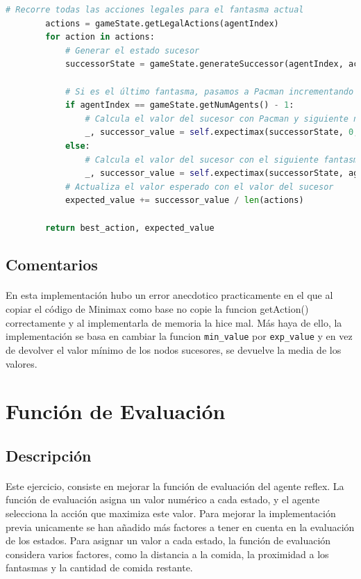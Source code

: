 \documentclass{report}
\begin{document}
\begin{lstlisting}[language=Python, caption=Implementación final del agente Expectimax]
        # Recorre todas las acciones legales para el fantasma actual
        actions = gameState.getLegalActions(agentIndex)
        for action in actions:
            # Generar el estado sucesor
            successorState = gameState.generateSuccessor(agentIndex, action)
            
            # Si es el último fantasma, pasamos a Pacman incrementando la profundidad
            if agentIndex == gameState.getNumAgents() - 1:
                # Calcula el valor del sucesor con Pacman y siguiente nivel de profundidad
                _, successor_value = self.expectimax(successorState, 0, depth + 1)
            else:
                # Calcula el valor del sucesor con el siguiente fantasma
                _, successor_value = self.expectimax(successorState, agentIndex + 1, depth)
            # Actualiza el valor esperado con el valor del sucesor
            expected_value += successor_value / len(actions)

        return best_action, expected_value            
            \end{lstlisting}
        \subsection*{Comentarios}
          \paragraph*{}{
            En esta implementación hubo un error anecdotico practicamente en el que al copiar el código de Minimax como base no copie la funcion getAction() correctamente y al implementarla de memoria la hice mal.
            Más haya de ello, la implementación se basa en cambiar la funcion \texttt{min\_value} por \texttt{exp\_value} y en vez de devolver el valor mínimo de los nodos sucesores, se devuelve la media de los valores.
          }
      \clearpage\section{Función de Evaluación}
        \subsection*{Descripción}
          \paragraph*{}{
            Este ejercicio, consiste en mejorar la función de evaluación del agente reflex. 
            La función de evaluación asigna un valor numérico a cada estado, y el agente selecciona la acción que maximiza este valor. 
            Para mejorar la implementación previa unicamente se han añadido más factores a tener en cuenta en la evaluación de los estados.
            Para asignar un valor a cada estado, la función de evaluación considera varios factores, como la distancia a la comida, la proximidad a los fantasmas y la cantidad de comida restante.
          }
\end{document}
